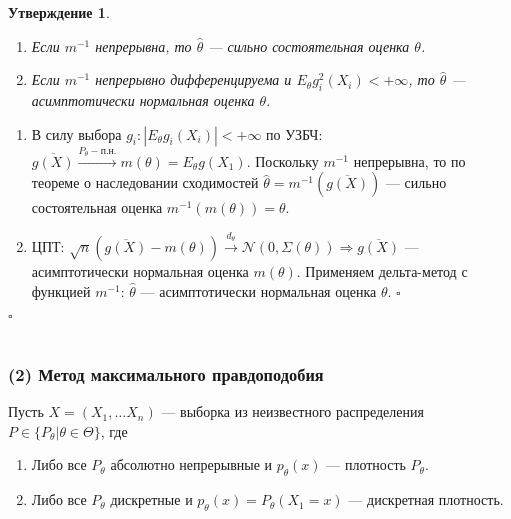 \documentclass[12pt]{report}
\renewenvironment{proof}{{\bfseries Доказательство:}}{$\square$\\\\}
\newtheorem{proposition}{Утверждение}
\theoremstyle{definition}
\begin{document}
\begin{proposition}
	$\;$
	\begin{enumerate}
		\item Если $m^{-1}$ непрерывна, то $\hat{\theta}$ — сильно состоятельная оценка $\theta$.
		\item Если $m^{-1}$ непрерывно дифференцируема и $E_\theta g_i^2(X_i) < +\infty$, то $\hat{\theta}$ — асимптотически нормальная оценка $\theta$.
	\end{enumerate}
\end{proposition}
\begin{proof}
	\begin{enumerate}
		\item В силу выбора $g_i:|E_\theta g_i(X_i)| < +\infty$ по УЗБЧ: $\overline{g(X)} \xrightarrow{P_\theta-п.н.} m(\theta) = E_\theta g(X_1)$. Поскольку $m^{-1}$ непрерывна, то по теореме о наследовании сходимостей $\hat{\theta} = m^{-1}(\overline{g(X)})$ — сильно состоятельная оценка $m^{-1}(m(\theta))=\theta$.
		\item ЦПТ: $\sqrt{n}(\overline{g(X)} - m(\theta)) \xrightarrow{d_\theta} \mathcal{N}(0, \Sigma(\theta))\Rightarrow \overline{g(X)}$ — асимптотически нормальная оценка $m(\theta)$. Применяем дельта-метод с функцией $m^{-1}$: $\hat{\theta}$ — асимптотически нормальная оценка $\theta$. $\square$
	\end{enumerate}
\end{proof}

\subsubsection{(2) Метод максимального правдоподобия}
Пусть $X=(X_1, \ldots X_n)$ — выборка из неизвестного распределения $P \in \{P_\theta|\theta \in \Theta\}$, где
\begin{enumerate}
	\item Либо все $P_\theta$ абсолютно непрерывные и $p_\theta(x)$ — плотность $P_\theta$.
	\item Либо все $P_\theta$ дискретные и $p_\theta(x) = P_\theta(X_1 = x)$ — дискретная плотность.	
\end{enumerate}
\end{document}
